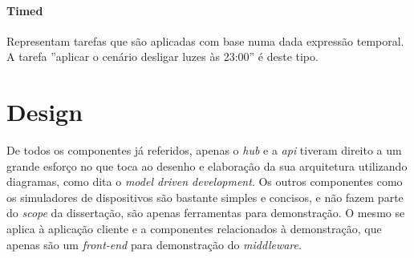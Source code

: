 \paragraph*{Timed}
Representam tarefas que são aplicadas com base numa dada expressão temporal. A tarefa ''aplicar o cenário desligar luzes às 23:00'' é deste tipo.

\section{Design}

De todos os componentes já referidos, apenas o \textit{hub} e a \textit{api} tiveram direito a um grande esforço no que toca ao desenho e elaboração da sua arquitetura utilizando diagramas, como dita o \textit{model driven development}. Os outros componentes como os simuladores de dispositivos são bastante simples e concisos, e não fazem parte do \textit{scope} da dissertação, são apenas ferramentas para demonstração. O mesmo se aplica à aplicação cliente e a componentes relacionados à demonstração, que apenas são um \textit{front-end} para demonstração do \textit{middleware}.


